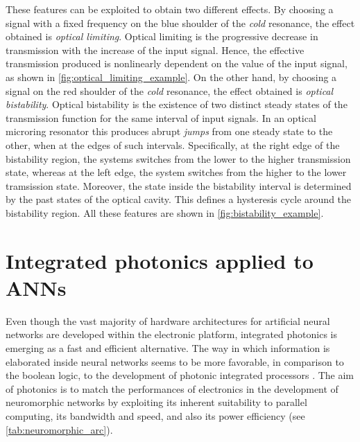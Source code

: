 These features can be exploited to obtain two different effects.
By choosing a signal with a fixed frequency on the blue shoulder of the \textit{cold} resonance, the effect obtained is \textit{optical limiting}.
Optical limiting is the progressive decrease in transmission with the increase of the input signal.
Hence, the effective transmission produced is nonlinearly dependent on the value of the input signal, as shown in \autoref{fig:optical_limiting_example}.
On the other hand, by choosing a signal on the red shoulder of the \textit{cold} resonance, the effect obtained is \textit{optical bistability}.
Optical bistability is the existence of two distinct steady states of the transmission function for the same interval of input signals.
In an optical microring resonator this produces abrupt \textit{jumps} from one steady state to the other, when at the edges of such intervals.
Specifically, at the right edge of the bistability region, the systems switches from the lower to the higher transmission state, whereas at the left edge, the system switches from the higher to the lower tramsission state.
Moreover, the state inside the bistability interval is determined by the past states of the optical cavity.
This defines a hysteresis cycle around the bistability region.
All these features are shown in \autoref{fig:bistability_example}.

\clearpage
\section{Integrated photonics applied to ANNs}
\label{sec:Integrated_photonics_applied_to_ANNs}
Even though the vast majority of hardware architectures for artificial neural networks are developed within the electronic platform, integrated photonics is emerging as a fast and efficient alternative.
The way in which information is elaborated inside neural networks seems to be more favorable, in comparison to the boolean logic, to the development of photonic integrated processors \cite{shastri2017emergence}.
The aim of photonics is to match the performances of electronics in the development of neuromorphic networks by exploiting its inherent suitability to parallel computing, its bandwidth and speed, and also its power efficiency (see \autoref{tab:neuromorphic_arc}).


